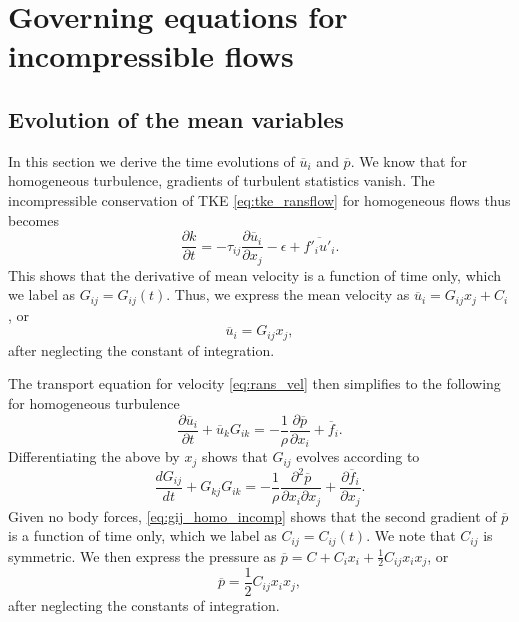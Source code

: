 \documentclass[oneside,a4paper,11pt]{report}
\newcommand{\favg}{\overline{f}}
\newcommand{\pavg}{\overline{p}}
\newcommand{\uavg}{\overline{u}}
\newcommand{\ffluc}{f'}
\newcommand{\ufluc}{u'}
\newcommand{\rs}{\tau}          %
\begin{document}
%
\chapter{Governing equations for incompressible flows}
%

\section{Evolution of the mean variables}
\label{sec:homo_mean_incomp}
In this section we derive the time evolutions of $\uavg_i$ and $\pavg$. We know that for homogeneous turbulence, gradients of turbulent statistics vanish. The incompressible conservation of TKE \cref{eq:tke_ransflow} for homogeneous flows thus becomes
\begin{equation}
\frac{\partial k}{\partial t} = -\rs_{ij} \frac{\partial \uavg_i}{\partial x_j} - \epsilon + \overline{ \ffluc_i \ufluc_i }.
\end{equation}
This shows that the derivative of mean velocity is a function of time only, which we label as $G_{ij} = G_{ij}(t)$. Thus, we express the mean velocity as $\uavg_i = G_{ij} x_j + C_i$, or 
\begin{equation}
\label{eq:ui_homo_incomp}
\uavg_i = G_{ij} x_j ,
\end{equation}
after neglecting the constant of integration.

The transport equation for velocity \cref{eq:rans_vel} then simplifies to the following for homogeneous turbulence
\begin{equation}
\frac{\partial \uavg_i}{\partial t} + \uavg_k G_{ik} = -\frac{1}{\rho} \frac{\partial \pavg}{\partial x_i} + \favg_i.
\end{equation}
Differentiating the above by $x_j$ shows that $G_{ij}$ evolves according to
\begin{equation}
\label{eq:gij_homo_incomp}
\frac{d G_{ij} }{d t} + G_{kj}G_{ik} = -\frac{1}{\rho} \frac{\partial ^2 \pavg}{\partial x_i \partial x_j} + \frac{\partial \favg_i}{\partial x_j} .
\end{equation}
Given no body forces, \cref{eq:gij_homo_incomp} shows that the second gradient of $\pavg$ is a function of time only, which we label as $C_{ij} = C_{ij}(t)$. We note that $C_{ij}$ is symmetric. We then express the pressure as $\pavg = C + C_i x_i + \frac{1}{2} C_{ij} x_ix_j$, or
\begin{equation}
    \pavg = \frac{1}{2} C_{ij} x_i x_j,
\end{equation}
after neglecting the constants of integration. 
\end{document}
